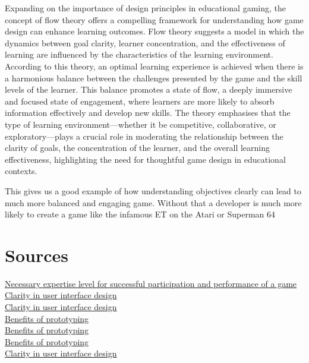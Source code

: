 \documentclass{article}
\begin{document}
Expanding on the importance of design principles in educational gaming, the concept of flow theory offers a compelling framework for understanding how game design can enhance learning outcomes. Flow theory suggests a model in which the dynamics between goal clarity, learner concentration, and the effectiveness of learning are influenced by the characteristics of the learning environment. According to this theory, an optimal learning experience is achieved when there is a harmonious balance between the challenges presented by the game and the skill levels of the learner. This balance promotes a state of flow, a deeply immersive and focused state of engagement, where learners are more likely to absorb information effectively and develop new skills. The theory emphasises that the type of learning environment—whether it be competitive, collaborative, or exploratory—plays a crucial role in moderating the relationship between the clarity of goals, the concentration of the learner, and the overall learning effectiveness, highlighting the need for thoughtful game design in educational contexts.

This gives us a good example of how understanding objectives clearly can lead to much more balanced and engaging game. Without that a developer is much more likely to create a game like the infamous ET on the Atari or Superman 64
 
\break
\section{Sources}
\href{https://www.reddit.com/r/software/comments/ls6piz/good_software_for_designing_a_2d_platformer/}{Necessary expertise level for successful participation and performance of a game} \\
\href{https://www.argentics.io/how-vital-is-well-designed-ui-for-a-positive-game-user-experience}{Clarity in user interface design} \\
\href{https://www.researchgate.net/publication/263426149_Relationships_between_Goal_Clarity_Concentration_and_Learning_Effectiveness_when_Playing_Serious_Games}{Clarity in user interface design} \\
\href{https://marvelapp.com/blog/what-are-the-benefits-of-prototyping/}{Benefits of prototyping} \\
\href{https://www.design2market.co.uk/academy/what-is-a-prototype/}{Benefits of prototyping} \\
\href{https://ideafoster.com/en/benefits-prototyping/}{Benefits of prototyping} \\
\href{https://retrostylegames.com/blog/game-user-interface-design-examples/}{Clarity in user interface design} \\ 
\end{document}
